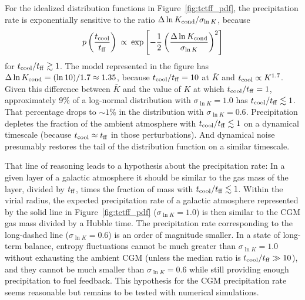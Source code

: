 \documentclass[twocolumn]{aastex63}
\begin{document}
For the idealized distribution functions in Figure~\ref{fig:tctff_pdf}, the precipitation rate is exponentially sensitive to the ratio $\Delta \ln K_{\rm cond} / \sigma_{\ln K}$, because
\begin{equation}
    p \left( \frac {t_{\rm cool}} {t_{\rm ff}} \right) 
     \: \propto \: 
      \exp \left[ - \frac {1} {2} 
             \left( \frac { \Delta \ln K_{\rm cond}} 
                          {\sigma_{\ln K}} \right)^2 \right]
    \label{eq:pdf}
\end{equation}
for $t_{\rm cool} / t_{\rm ff} \gtrsim 1$. The model represented in the figure has $\Delta \ln K_{\rm cond} = (\ln 10) / 1.7 \approx 1.35$, because $t_{\rm cool} / t_{\rm ff} = 10$ at $\bar{K}$ and $t_{\rm cool} \propto K^{1.7}$.  Given this difference between $\bar{K}$ and the value of $K$ at which $t_{\rm cool} / t_{\rm ff} = 1$, approximately 9\% of a log-normal distribution with $\sigma_{\ln K} = 1.0$ has $t_{\rm cool} / t_{\rm ff} \lesssim 1$. That percentage drops to $\sim 1$\% in the distribution with $\sigma_{\ln K} = 0.6$.  Precipitation depletes the fraction of the ambient atmosphere with $t_{\rm cool} / t_{\rm ff} \lesssim 1$ on a dynamical timescale (because $t_{\rm cool} \approx t_{\rm ff}$ in those perturbations).  And dynamical noise presumably restores the tail of the distribution function on a similar timescale.  

That line of reasoning leads to a hypothesis about the precipitation rate: In a given layer of a galactic atmosphere it should be similar to the gas mass of the layer, divided by $t_{\rm ff}$, times the fraction of mass with $t_{\rm cool} / t_{\rm ff} \lesssim 1$.  Within the virial radius, the expected precipitation rate of a galactic atmosphere represented by the solid line in Figure~\ref{fig:tctff_pdf} ($\sigma_{\ln K} = 1.0$) is then similar to the CGM gas mass divided by a Hubble time.  The precipitation rate corresponding to the long-dashed line ($\sigma_{\ln K} = 0.6$) is an order of magnitude smaller.  In a state of long-term balance, entropy fluctuations cannot be much greater than $\sigma_{\ln K} = 1.0$ without exhausting the ambient CGM (unless the median ratio is $t_{\rm cool} / t_{\rm ff} \gg 10$), and they cannot be much smaller than $\sigma_{\ln K} = 0.6$ while still providing enough precipitation to fuel feedback. This hypothesis for the CGM precipitation rate seems reasonable but remains to be tested with numerical simulations.
\end{document}
